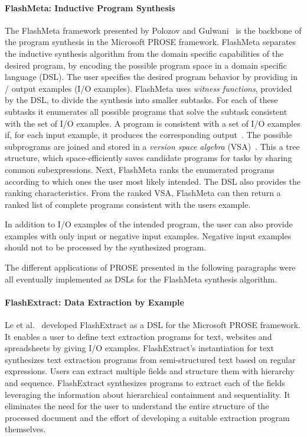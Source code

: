 \documentclass[\myrootdir/main.tex]{subfiles}
\begin{document}
\paragraph{FlashMeta: Inductive Program Synthesis}
The FlashMeta framework presented by Polozov and Gulwani~\cite{polozov2015flashmeta:} is the backbone of the program synthesis in the Microsoft PROSE framework.
FlashMeta separates the inductive synthesis algorithm from the domain specific capabilities of the desired program, by encoding the possible program space in a domain specific language (DSL).
The user specifies the desired program behavior by providing in / output examples (I/O examples).
FlashMeta uses \emph{witness functions}, provided by the DSL, to divide the synthesis into smaller subtasks.
For each of these subtasks it enumerates all possible programs that solve the subtask consistent with the set of I/O examples.
A program is consistent with a set of I/O examples if, for each input example, it produces the corresponding output~\cite{mitchell1982generalization}.
The possible subprograms are joined and stored in a \emph{version space algebra} (VSA)~\cite{mitchell1982generalization}.
This a tree structure, which space-efficiently saves candidate programs for tasks by sharing common subexpressions.
Next, FlashMeta ranks the enumerated programs according to which ones the user most likely intended.
The DSL also provides the ranking characteristics.
From the ranked VSA, FlashMeta can then return a ranked list of complete programs consistent with the users example.

In addition to I/O examples of the intended program, the user can also provide examples with only input or negative input examples.
Negative input examples should not to be processed by the synthesized program.

The different applications of PROSE presented in the following paragraphs were all eventually implemented as DSLs for the FlashMeta synthesis algorithm.

\paragraph{FlashExtract: Data Extraction by Example}
Le et al.~\cite{le2014flashextract:} developed FlashExtract as a DSL for the Microsoft PROSE framework.
It enables a user to define text extraction programs for text, websites and spreadsheets by giving I/O examples.
FlashExtract's instantiation for text synthesizes text extraction programs from semi-structured text based on regular expressions.
Users can extract multiple fields and structure them with hierarchy and sequence.
FlashExtract synthesizes programs to extract each of the fields leveraging the information about hierarchical containment and sequentiality.
It eliminates the need for the user to understand the entire structure of the processed document and the effort of developing a suitable extraction program themselves.
\end{document}
